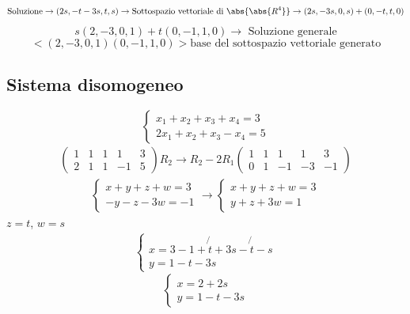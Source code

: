 \begin{equation*}
  \text{Soluzione} \to (2s,-t-3s,t,s) \to \text{Sottospazio vettoriale di } \abs{\abs{R^4}} \to (2s,-3s,0,s)+(0,-t,t,0)
\end{equation*}
\begin{equation*}
  \boxed{s(2,-3,0,1)+t(0,-1,1,0)}\to \text{ Soluzione generale}
\end{equation*}
\begin{equation*}
  <(2,-3,0,1)(0,-1,1,0)> \text{base del sottospazio vettoriale generato}
\end{equation*}
\subsection{Sistema disomogeneo}
\label{sec:sistemadisomogeneo}

\begin{equation*}
   \begin{cases}
     x_1+x_2+x_3+x_4=3\\
    2x_1+x_2+x_3-x_4=5   
  \end{cases}  
\end{equation*}
\begin{eqnarray*}
  \left(
  \begin{array}{cccc|c}
    1&1&1&1&3\\
    2&1&1&-1&5
  \end{array}
  \right)R_2\to R_2-2R_1
  \left(
  \begin{array}{cccc|c}
    1&1&1&1&3\\
    0&1&-1&-3&-1
  \end{array}
  \right)
\end{eqnarray*}
\begin{eqnarray*}
  \begin{cases}
    x+y+z+w=3\\
    -y-z-3w=-1
  \end{cases}\to
  \begin{cases}
    x+y+z+w=3\\
    y+z+3w=1
  \end{cases}
\end{eqnarray*}
$z=t$, $w=s$
\begin{eqnarray*}
  \begin{cases}
    x=3-1+\not{t}+3s-\not{t}-s\\
    y=1-t-3s
  \end{cases}
\end{eqnarray*}
\begin{equation*}
  \begin{cases}
    x=2+2s\\
    y=1-t-3s   
  \end{cases}
\end{equation*}
